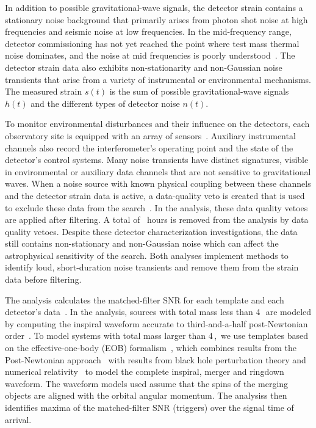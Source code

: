 In addition to possible gravitational-wave signals, the detector strain
contains a stationary noise background that primarily arises from photon shot
noise at high frequencies and seismic noise at low frequencies.  In the
mid-frequency range, detector commissioning has not yet reached the point
where test mass thermal noise dominates, and the noise at mid frequencies is
poorly
understood~\cite{GW150914-DETECTORS,GW150914-DETCHAR,InstrumentNoisePaper}.
The detector strain data also exhibits non-stationarity and non-Gaussian noise
transients that arise from a variety of instrumental or environmental
mechanisms. The measured strain $s(t)$ is the sum of possible
gravitational-wave signals $h(t)$ and the different types of detector noise
$n(t)$.

To monitor environmental disturbances and their influence on the detectors,
each observatory site is equipped with an array of
sensors~\cite{Effler:2014zpa}.  Auxiliary instrumental channels also record
the interferometer's operating point and the state of the detector's control
systems. Many noise transients have distinct signatures, visible in
environmental or auxiliary data channels that are not sensitive to
gravitational waves. When a noise source with known physical coupling between
these channels and the detector strain data is active, a data-quality veto is
created that is used to exclude these data from the
search~\cite{GW150914-DETCHAR}.
In the \pycbc{} analysis, these data quality vetoes are applied after filtering.  A
total of \CatTwoVetoTime{}~hours is removed from the analysis by data quality
vetoes.  Despite these detector characterization investigations, the data
still contains non-stationary and non-Gaussian noise which can affect the
astrophysical sensitivity of the search. Both analyses implement methods to
identify loud, short-duration noise transients and remove them from the strain
data before filtering.


The \pycbc{} analysis calculates the matched-filter SNR for each
template and each detector's data~\cite{Allen:2005fk,Cannon2010}.  In the
\pycbc{} analysis, sources with total mass less than 4$\,$\Msun~are modeled by
computing the inspiral waveform accurate to third-and-a-half post-Newtonian
order~\cite{Blanchet:1995ez,Droz:1999qx,Blanchet:2004ek}.  To model systems
with total mass larger than 4$\,$\Msun,~we use templates based on the
effective-one-body (EOB) formalism~\cite{Buonanno:2000ef}, which combines
results from the Post-Newtonian
approach~\cite{Blanchet:1995ez,Blanchet:2004ek} with results from black hole
perturbation theory and numerical
relativity~\cite{Taracchini:2013rva,Puerrer:2014fza} to model the complete
inspiral, merger and ringdown waveform.  The waveform models used assume that
the spins of the merging objects are aligned with the orbital angular
momentum. The analysiss then identifies maxima of the matched-filter SNR (triggers)
over the signal time of arrival.

